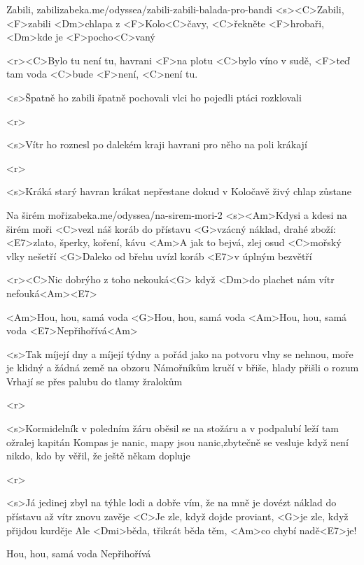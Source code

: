 \begin{song}{43}{Zabili, zabili}{zabeka.me/odyssea/zabili-zabili-balada-pro-bandi}
	<s><C>Zabili, <F>zabili <Dm>chlapa z <F>Kolo<C>čavy,
	<C>řekněte <F>hrobaři, <Dm>kde je <F>pocho<C>vaný

	<r><C>Bylo tu není tu, havrani <F>na plotu
	<C>bylo víno v sudě, <F>teď tam voda <C>bude
	<F>není, <C>není tu.

	<s>Špatně ho zabili
	špatně pochovali
	vlci ho pojedli
	ptáci rozklovali

	<r>

	<s>Vítr ho roznesl
	po dalekém kraji
	havrani pro něho
	na poli krákají

	<r>

	<s>Kráká starý havran
	krákat nepřestane
	dokud v Koločavě
	živý chlap zůstane

\end{song}
\begin{song}[Traband]{44}{Na širém moři}{zabeka.me/odyssea/na-sirem-mori-2}
	<s><Am>Kdysi a kdesi na širém moři <C>vezl náš koráb do přístavu
	<G>vzácný náklad, drahé zboží: <E7>zlato, šperky, koření, kávu
	<Am>A jak to bejvá, zlej osud <C>mořský vlky nešetří
	<G>Daleko od břehu uvízl koráb <E7>v úplným bezvětří

	<r><C>Nic dobrýho z toho nekouká<G>
	když <Dm>do plachet nám vítr nefouká<Am><E7>

	<Am>Hou, hou, samá voda
	<G>Hou, hou, samá voda
	<Am>Hou, hou, samá voda
	<E7>Nepřihořívá<Am>

	<s>Tak míjejí dny a míjejí týdny a pořád jako na potvoru
	vlny se nehnou, moře je klidný a žádná země na obzoru
	Námořníkům kručí v břiše, hlady přišli o rozum
	Vrhají se přes palubu do tlamy žralokům

	<r>

	<s>Kormidelník v poledním žáru oběsil se na stožáru
	a v podpalubí leží tam ožralej kapitán
	Kompas je nanic, mapy jsou nanic,zbytečně se vesluje
	když není nikdo, kdo by věřil, že ještě někam dopluje

	<r>

	<s>Já jedinej zbyl na týhle lodi a dobře vím, že na mně je
	dovézt náklad do přístavu až vítr znovu zavěje
	<C>Je zle, když dojde proviant, <G>je zle, když přijdou kurděje
	Ale <Dmi>běda, třikrát běda těm, <Am>co chybí nadě<E7>je!

	Hou, hou, samá voda
	Nepřihořívá

\end{song}
